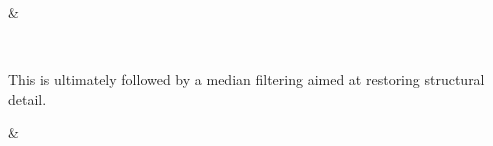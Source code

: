 \documentclass[letterpaper,10pt,english]{sphinxmanual}
\begin{document}
\begin{savenotes}\sphinxattablestart
\sphinxthistablewithglobalstyle
\centering
\begin{tabular}[t]{}
\sphinxtoprule
\sphinxtableatstartofbodyhook

\begin{sphinxfigure-in-table}
\centering
\capstart
\noindent{}
\label{\detokenize{data:id14}}\end{sphinxfigure-in-table}\relax
&

\begin{sphinxfigure-in-table}
\centering
\capstart
\noindent{}
\label{\detokenize{data:id15}}\end{sphinxfigure-in-table}\relax
\\
\sphinxbottomrule
\end{tabular}
\sphinxtableafterendhook\par
\sphinxattableend\end{savenotes}

\sphinxAtStartPar
This is ultimately followed by a median filtering aimed at restoring structural
detail.


\begin{savenotes}\sphinxattablestart
\sphinxthistablewithglobalstyle
\centering
\begin{tabular}[t]{}
\sphinxtoprule
\sphinxtableatstartofbodyhook

\begin{sphinxfigure-in-table}
\centering
\capstart
\noindent{}
\label{\detokenize{data:id16}}\end{sphinxfigure-in-table}\relax
&

\begin{sphinxfigure-in-table}
\centering
\capstart
\noindent{}
\label{\detokenize{data:id17}}\end{sphinxfigure-in-table}\relax
\\
\sphinxbottomrule
\end{tabular}
\sphinxtableafterendhook\par
\sphinxattableend\end{savenotes}
\end{document}
